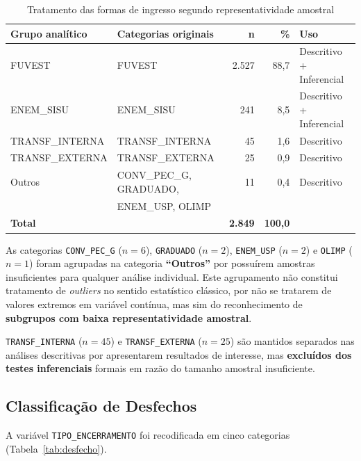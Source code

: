 \documentclass[12pt, a4paper]{article}
\begin{document}
\begin{table}[H]
\centering
\caption{Tratamento das formas de ingresso segundo representatividade amostral}
\label{tab:ingresso_grupos}
\begin{tabular}{@{}llrrl@{}}
\toprule
\textbf{Grupo analítico} & \textbf{Categorias originais} & \textbf{n} & \textbf{\%} & \textbf{Uso} \\
\midrule
FUVEST          & FUVEST          & 2.527 & 88,7 & Descritivo + Inferencial \\
ENEM\_SISU      & ENEM\_SISU      &   241 &  8,5 & Descritivo + Inferencial \\
TRANSF\_INTERNA & TRANSF\_INTERNA &    45 &  1,6 & Descritivo \\
TRANSF\_EXTERNA & TRANSF\_EXTERNA &    25 &  0,9 & Descritivo \\
Outros          & CONV\_PEC\_G, GRADUADO, & 11 & 0,4 & Descritivo \\
                & ENEM\_USP, OLIMP & & & \\
\midrule
\textbf{Total}  & & \textbf{2.849} & \textbf{100,0} & \\
\bottomrule
\end{tabular}
\end{table}

As categorias \texttt{CONV\_PEC\_G} ($n=6$), \texttt{GRADUADO} ($n=2$),
\texttt{ENEM\_USP} ($n=2$) e \texttt{OLIMP} ($n=1$) foram agrupadas na
categoria \textbf{``Outros''} por possuírem amostras insuficientes para
qualquer análise individual. Este agrupamento não constitui tratamento de
\emph{outliers} no sentido estatístico clássico, por não se tratarem de valores
extremos em variável contínua, mas sim do reconhecimento de
\textbf{subgrupos com baixa representatividade amostral}.

\texttt{TRANSF\_INTERNA} ($n=45$) e \texttt{TRANSF\_EXTERNA} ($n=25$)
são mantidos separados nas análises descritivas por apresentarem resultados
de interesse, mas \textbf{excluídos dos testes inferenciais} formais em
razão do tamanho amostral insuficiente.

\subsection{Classificação de Desfechos}

A variável \texttt{TIPO\_ENCERRAMENTO} foi recodificada em cinco categorias
(Tabela~\ref{tab:desfecho}).
\end{document}
